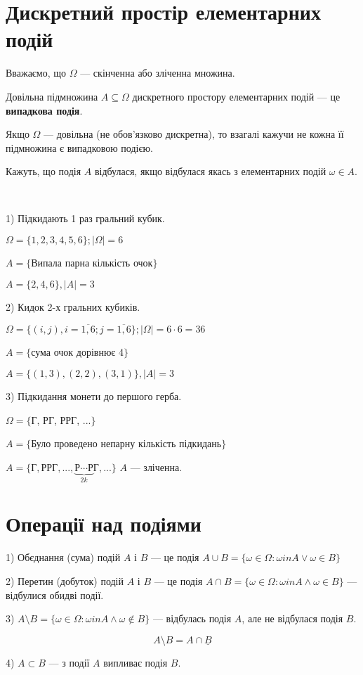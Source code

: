 \section{Дискретний простір елементарних подій}

Вважаємо, що $\Omega$ --- скінченна або зліченна множина.

 \begin{definition}
    Довільна підмножина $A \subseteq \Omega$ дискретного
    простору елементарних подій --- це \textbf{випадкова
    подія}.
 \end{definition}

 \begin{remark}
    Якщо $\Omega$ --- довільна (не обов'язково дискретна),
    то взагалі кажучи не кожна її підмножина є випадковою
    подією.
 \end{remark}

 Кажуть, що подія $A$ відбулася, якщо відбулася якась з 
 елементарних подій $\omega \in A$.

 \begin{example}~\par
    1) Підкидають 1 раз гральний кубик.\par
    $\Omega = \{1, 2, 3, 4, 5,6\}; |\Omega| = 6$\par
    $A = \{$Випала парна кількість очок$\}$\par
    $A = \{2, 4, 6\}, |A| = 3$

    2) Кидок 2-х гральних кубиків.\par
    $\Omega = \{(i,j), i=\overline{1,6};
        j=\overline{1,6}\}; |\Omega| = 6 \cdot 6 = 36$\par
    $A = \{$сума очок дорівнює 4$\}$\par
    $A = \{(1,3), (2,2), (3,1)\}, |A| = 3$

    3) Підкидання монети до першого герба.\par
    $\Omega = \{$Г, РГ, РРГ, ...$\}$\par
    $A = \{$Було проведено непарну кількість підкидань$\}$\par
    $A = \{\text{Г}, \text{РРГ}, ..., \underbrace{\text{Р}\cdots\text{Р}}\limits_{2k}\text{Г}, ...\}$
    $A$ --- зліченна.

    \section{Операції над подіями}

    1) Обєднання (сума) подій $A$ і $B$ --- це подія
    $A \cup B = \{\omega \in \Omega: \omega in A \vee \omega \in B\}$

    2) Перетин (добуток) подій $A$ і $B$ --- це подія
    $A \cap B = \{\omega \in \Omega: \omega in A \wedge \omega \in B\}$
    --- відбулися обидві події.

    3) $A \setminus B = \{\omega \in \Omega: \omega in A \wedge \omega \notin B\}$
    --- відбулась подія $A$, але не відбулася подія $B$.

    $$A \setminus B = A \cap \underline{B}$$

    4) $A \subset B$ --- з події $A$ випливає подія $B$.
 \end{example}


